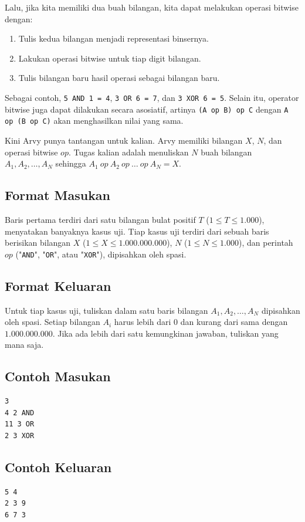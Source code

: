 \documentclass{article}
\begin{document}
Lalu, jika kita memiliki dua buah bilangan, kita dapat melakukan operasi bitwise dengan:
\begin{enumerate}
    \item Tulis kedua bilangan menjadi representasi binsernya.
    \item Lakukan operasi bitwise untuk tiap digit bilangan.
    \item Tulis bilangan baru hasil operasi sebagai bilangan baru.
\end{enumerate}

Sebagai contoh, \lstinline{5 AND 1 = 4}, \lstinline{3 OR 6 = 7}, dan \lstinline{3 XOR 6 = 5}.
Selain itu, operator bitwise juga dapat dilakukan secara asosiatif, artinya \lstinline{(A op B) op C} dengan \lstinline{A op (B op C)} akan menghasilkan nilai yang sama.

Kini Arvy punya tantangan untuk kalian.
Arvy memiliki bilangan $X$, $N$, dan operasi bitwise $op$.
Tugas kalian adalah menuliskan $N$ buah bilangan $A_1, A_2, \dots, A_N$ sehingga $A_1 \  op \  A_2 \  op \  \dots \  op \  A_N = X$.

\subsection*{Format Masukan}

Baris pertama terdiri dari satu bilangan bulat positif $T$ ($1 \leq T \leq 1.000$), menyatakan banyaknya kasus uji.
Tiap kasus uji terdiri dari sebuah baris berisikan bilangan $X$ ($1 \leq X \leq 1.000.000.000$), $N$ ($1 \leq N \leq 1.000$), dan perintah $op$ ("\lstinline{AND}", "\lstinline{OR}", atau "\lstinline{XOR}"), dipisahkan oleh spasi.

\subsection*{Format Keluaran}

Untuk tiap kasus uji, tuliskan dalam satu baris bilangan $A_1, A_2, \dots, A_N$ dipisahkan oleh spasi.
Setiap bilangan $A_i$ harus lebih dari $0$ dan kurang dari sama dengan $1.000.000.000$.
Jika ada lebih dari satu kemungkinan jawaban, tuliskan yang mana saja.
\\

\begin{multicols}{2}
\subsection*{Contoh Masukan}
\begin{lstlisting}
3
4 2 AND
11 3 OR
2 3 XOR
\end{lstlisting}
\columnbreak
\subsection*{Contoh Keluaran}
\begin{lstlisting}
5 4
2 3 9
6 7 3
\end{lstlisting}
\vfill
\null
\end{multicols}

\pagebreak
\end{document}
